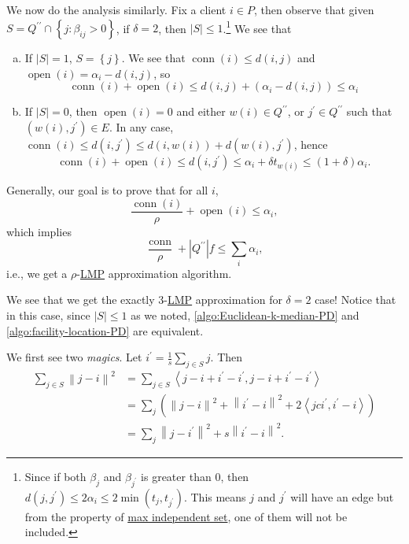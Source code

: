 We now do the analysis similarly. Fix a client \(i\in P\), then observe that given \(S = Q^{\prime\prime} \cap \left\{ j\colon \beta _{ij} > 0 \right\}\), if \(\delta = 2\), then \(\left\vert S \right\vert \leq 1\).\footnote{Since if both \(\beta _j\) and \(\beta _{j^\prime }\) is greater than \(0\), then \(d(j, j^\prime ) \leq 2\alpha _i \leq 2 \min (t_j , t_{j^\prime })\). This means \(j\) and \(j^\prime \) will have an edge but from the property of \hyperref[prb:max-strongly-independent-set]{max independent set}, one of them will not be included.} We see that
\begin{enumerate}[(a)]
	\item If \(\left\vert S \right\vert = 1\), \(S = \left\{ j \right\} \). We see that \(\mathop{\mathrm{conn}}(i) \leq d(i, j)\) and \(\mathop{\mathrm{open}}(i) = \alpha _i - d(i, j)\), so
	      \[
		      \mathop{\mathrm{conn}}(i) + \mathop{\mathrm{open}}(i) \leq d(i, j) + (\alpha _i - d(i, j)) \leq \alpha _i
	      \]
	\item If \(\left\vert S \right\vert = 0\), then \(\mathop{\mathrm{open}}(i) = 0\) and either \(w(i)\in Q^{\prime\prime}\), or \(j^\prime \in Q^{\prime\prime}\) such that \((w(i), j^\prime )\in E\). In any case, \(\mathop{\mathrm{conn}}(i) \leq d(i, j^\prime ) \leq d(i, w(i)) + d(w(i), j^\prime )\), hence
	      \[
		      \mathop{\mathrm{conn}}(i) + \mathop{\mathrm{open}}(i) \leq d(i, j^\prime )\leq \alpha _i + \delta t_{w(i)} \leq (1 + \delta )\alpha _i.
	      \]
\end{enumerate}

Generally, our goal is to prove that for all \(i\),
\begin{equation}
	\frac{\mathop{\mathrm{conn}}(i)}{\rho} + \mathop{\mathrm{open}}(i) \leq \alpha _i,
\end{equation}
which implies
\[
	\frac{\mathop{\mathrm{conn}}}{\rho } + \left\vert Q^{\prime\prime}\right\vert f \leq \sum_{i} \alpha _i,
\]
i.e., we get a \(\rho \)-\hyperref[def:LMP]{LMP} approximation algorithm.

\begin{remark}
	We see that we get the exactly \(3\)-\hyperref[def:LMP]{LMP} approximation for \(\delta = 2\) case! Notice that in this case, since \(\left\vert S \right\vert \leq 1\) as we noted, \autoref{algo:Euclidean-k-median-PD} and \autoref{algo:facility-location-PD} are equivalent.
\end{remark}

We first see two \emph{magics}. Let \(i^\prime = \frac{1}{s}\sum_{j\in S} j\). Then
\[
	\begin{split}
		\sum_{j\in S} \left\lVert j - i\right\rVert ^{2}
		&= \sum_{j\in S} \left\langle j - i + i^\prime - i^\prime , j - i + i^\prime - i^\prime  \right\rangle \\
		&= \sum_{j} \left( \left\lVert j - i\right\rVert ^{2} + \left\lVert i^\prime - i\right\rVert ^{2} + 2\left\langle j c i^\prime , i^\prime - i \right\rangle  \right) \\
		&= \sum_{j} \left\lVert j - i^\prime \right\rVert ^{2} + s \left\lVert i^\prime - i\right\rVert ^{2} .
	\end{split}
\]

